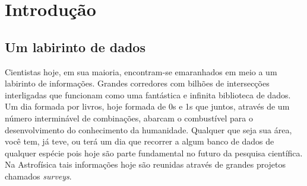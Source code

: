 


\chapter{Introdução}
\label{sec:Intro}


\section{Um labirinto de dados}
\label{sec:Intro:LabData}

Cientistas hoje, em sua maioria, encontram-se emaranhados em meio a um labirinto de informações. Grandes corredores com
bilhões de intersecções interligadas que funcionam como uma fantástica e infinita biblioteca de dados. Um dia formada
por livros, hoje formada de 0s e 1s que juntos, através de um número interminável de combinações, abarcam o combustível
para o desenvolvimento do conhecimento da humanidade. Qualquer que seja sua área, você tem, já teve, ou terá um dia que
recorrer a algum banco de dados de qualquer espécie pois hoje são parte fundamental no futuro da pesquisa científica. Na
Astrofísica tais informações hoje são reunidas através de grandes projetos chamados {\em surveys}.

